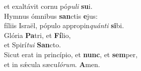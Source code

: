 \oddverse et exaltávit cornu pó\textit{pu}\textit{li} \textbf{su}i.\\
\evenverse Hymnus ómnibus \textbf{san}ctis \textbf{e}jus:~\*\\
\evenverse fíliis Israël, pópulo appropin\textit{quán}\textit{ti} \textbf{si}bi.\\
\oddverse Glória \textbf{Pa}tri, et \textbf{Fí}lio,~\*\\
\oddverse et Spirí\textit{tu}\textit{i} \textbf{San}cto.\\
\evenverse Sicut erat in princípio, et \textbf{nunc}, et \textbf{sem}per,~\*\\
\evenverse et in sǽcula sæcu\textit{ló}\textit{rum}. \textbf{A}men.\\
